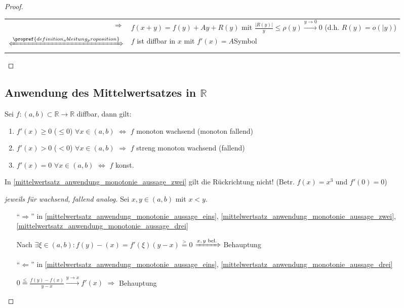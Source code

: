 \begin{proof}
	\begin{tabularx}{\linewidth}{rX@{}}
	$\Rightarrow$ & $f(x + y) = f(y) + Ay + R(y)$ mit $\frac{\vert R(y)\vert}{y} \le \rho(y) \xrightarrow{y\to 0} 0$ (d.h. $R(y) = o(\vert y)$) \\
	$\xLeftrightarrow{\propref{definition_ableitung_proposition}}$ & $f$ ist \gls{diffbar} in $x$ mit $f'(x) = A$\hfill\csname\InTheoType Symbol\endcsname
\end{tabularx}
\end{proof}

\subsection{Anwendung des Mittelwertsatzes in \texorpdfstring{$\mathbb{R}$}{R}}
\begin{proposition}[Monotonie]
	Sei $f:(a,b)\subset\mathbb{R}\to \mathbb{R}$ \gls{diffbar}, dann gilt:
	\begin{enumerate}[label={\roman*)}]
		\item {}$f'(x) \ge 0$ ($\le 0$) $\forall x\in (a,b)$ $\Leftrightarrow$ $f$ monoton wachsend (monoton fallend)
		\item {} 	$f'(x) > 0$ ($< 0$) $\forall x\in (a,b)$ $\Rightarrow$ $f$ streng monoton wachsend (fallend)
		\item {} $f'(x) = 0$ $\forall x\in (a,b)$ $\Leftrightarrow$ $f$ konst.
	\end{enumerate}
\end{proposition}

\begin{remark}
	In \ref{mittelwertsatz_anwendung_monotonie_aussage_zwei} gilt die Rückrichtung nicht! (Betr. $f(x) = x^3$ und $f'(0) = 0$)
\end{remark}

\begin{proof}[jeweils für wachsend, fallend analog]
	Sei $x,y\in (a,b)$ mit $x < y$.
	\begin{itemize}[topsep=\dimexpr -\baselineskip / 2 \relax]
		\item["`$\Rightarrow$"'] in \ref{mittelwertsatz_anwendung_monotonie_aussage_eins}, \ref{mittelwertsatz_anwendung_monotonie_aussage_zwei}, \ref{mittelwertsatz_anwendung_monotonie_aussage_drei}
		
		Nach  $\exists \xi\in(a,b): f(y) - (x) = f'(\xi) (y - x) \stackrel{>}{=} 0$ $\xRightarrow{\text{$x,y$ bel.}}$ Behauptung
		
		\item["`$\Leftarrow$"'] in \ref{mittelwertsatz_anwendung_monotonie_aussage_eins}, \ref{mittelwertsatz_anwendung_monotonie_aussage_drei}
		
		$0 \stackrel{\le}{=} \frac{f(y) - f(x)}{y - x} \xrightarrow{y\to x} f'(x)$ $\Rightarrow$ Behauptung
	\end{itemize}
\end{proof}

